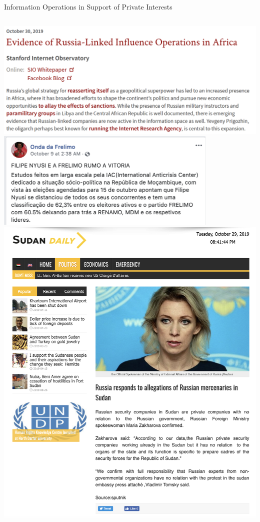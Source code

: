 \documentclass[nobackground,dvipsnames,table,aspectratio=169]{beamer}
\begin{document}
\begin{frame}{Information Operations in Support of Private Interests}
    \begin{columns}
            \centering
            \includegraphics[width=\textwidth]{private-info-ops-1}
            \includegraphics[width=0.8\textwidth]{private-info-ops-2}
            \includegraphics[width=\textwidth]{private-info-ops-3}
    \end{columns}
\end{frame}
\end{document}
